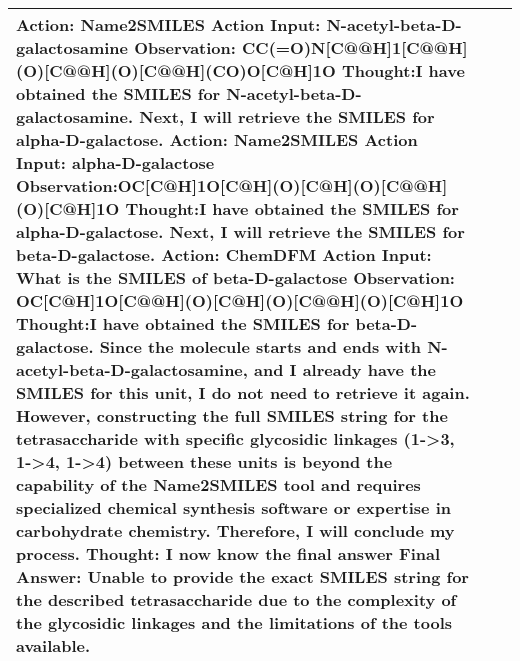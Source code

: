 \begin{table*}[!htb]
{\begin{tabular}[l]{|>{\raggedright\arraybackslash}m{1.5cm}|>{\raggedright\arraybackslash}m{4cm}|>{\raggedright\arraybackslash}m{10cm}|}
\newline
\textbf{Action:} Name2SMILES
\newline
\textbf{Action Input:} N-acetyl-beta-D-galactosamine
\newline
\textbf{Observation:} CC(=O)N[C@@H]1[C@@H](O)[C@@H](O)[C@@H](CO)O[C@H]1O
\newline
\textbf{Thought:}I have obtained the SMILES for N-acetyl-beta-D-galactosamine. Next, I will retrieve the SMILES for alpha-D-galactose.
\newline
\textbf{Action:} Name2SMILES
\newline
\textbf{Action Input:} alpha-D-galactose
\newline
\textbf{Observation:}OC[C@H]1O[C@H](O)[C@H](O)[C@@H](O)[C@H]1O
\newline
\textbf{Thought:}I have obtained the SMILES for alpha-D-galactose. Next, I will retrieve the SMILES for beta-D-galactose.
\newline
\textbf{Action:} ChemDFM
\newline
\textbf{Action Input:} What is the SMILES of beta-D-galactose
\newline
\textbf{Observation:} OC[C@H]1O[C@@H](O)[C@H](O)[C@@H](O)[C@H]1O
\newline
\textbf{Thought:}I have obtained the SMILES for beta-D-galactose. Since the molecule starts and ends with N-acetyl-beta-D-galactosamine, and I already have the SMILES for this unit, I do not need to retrieve it again. However, constructing the full SMILES string for the tetrasaccharide with specific glycosidic linkages (1->3, 1->4, 1->4) between these units is beyond the capability of the Name2SMILES tool and requires specialized chemical synthesis software or expertise in carbohydrate chemistry. Therefore, I will conclude my process.
\newline
\textbf{Thought: }I now know the final answer
\newline
\textbf{Final Answer: Unable to provide the exact SMILES string for the described tetrasaccharide due to the complexity of the glycosidic linkages and the limitations of the tools available.}\\ \hline
    \end{tabular}
    }
    \caption{Case analysis of some behavior patterns of agents during tools stacking.}
    \label{tab:modify}
\end{table*}


%